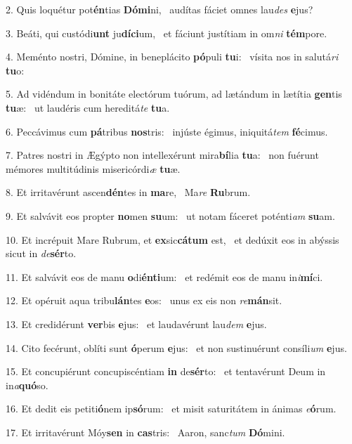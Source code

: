 2. Quis loquétur pot\textbf{én}tias \textbf{Dó}\textbf{mi}ni, \ast\  audítas fáciet omnes lau\textit{des} \textbf{e}jus?\

3. Beáti, qui custódi\textbf{unt} ju\textbf{dí}\textbf{ci}um, \ast\  et fáciunt justítiam in om\textit{ni} \textbf{tém}pore.\

4. Meménto nostri, Dómine, in beneplácito \textbf{pó}puli \textbf{tu}i: \ast\  vísita nos in salutá\textit{ri} \textbf{tu}o:\

5. Ad vidéndum in bonitáte electórum tuórum, ad lætándum in lætítia \textbf{gen}tis \textbf{tu}æ: \ast\  ut laudéris cum hereditá\textit{te} \textbf{tu}a.\

6. Peccávimus cum \textbf{pá}tribus \textbf{nos}tris: \ast\  injúste égimus, iniquitá\textit{tem} \textbf{fé}cimus.\

7. Patres nostri in Ægýpto non intellexérunt mira\textbf{bí}lia \textbf{tu}a: \ast\  non fuérunt mémores multitúdinis misericórdi\textit{æ} \textbf{tu}æ.\

8. Et irritavérunt ascen\textbf{dén}tes in \textbf{ma}re, \ast\  Ma\textit{re} \textbf{Ru}brum.\

9. Et salvávit eos propter \textbf{no}men \textbf{su}um: \ast\  ut notam fáceret poténti\textit{am} \textbf{su}am.\

10. Et incrépuit Mare Rubrum, et \textbf{ex}sic\textbf{cá}\textbf{tum} est, \ast\  et dedúxit eos in abýssis sicut in \textit{de}\textbf{sér}to.\

11. Et salvávit eos de manu \textbf{o}di\textbf{én}\textbf{ti}um: \ast\  et redémit eos de manu in\textit{i}\textbf{mí}ci.\

12. Et opéruit aqua tribu\textbf{lán}tes \textbf{e}os: \ast\  unus ex eis non \textit{re}\textbf{mán}sit.\

13. Et credidérunt \textbf{ver}bis \textbf{e}jus: \ast\  et laudavérunt lau\textit{dem} \textbf{e}jus.\

14. Cito fecérunt, oblíti sunt \textbf{ó}perum \textbf{e}jus: \ast\  et non sustinuérunt consíli\textit{um} \textbf{e}jus.\

15. Et concupiérunt concupiscéntiam \textbf{in} de\textbf{sér}to: \ast\  et tentavérunt Deum in in\textit{a}\textbf{quó}so.\

16. Et dedit eis petiti\textbf{ó}nem ip\textbf{só}rum: \ast\  et misit saturitátem in ánimas \textit{e}\textbf{ó}rum.\

17. Et irritavérunt Móy\textbf{sen} in \textbf{cas}tris: \ast\  Aaron, sanc\textit{tum} \textbf{Dó}mini.\

